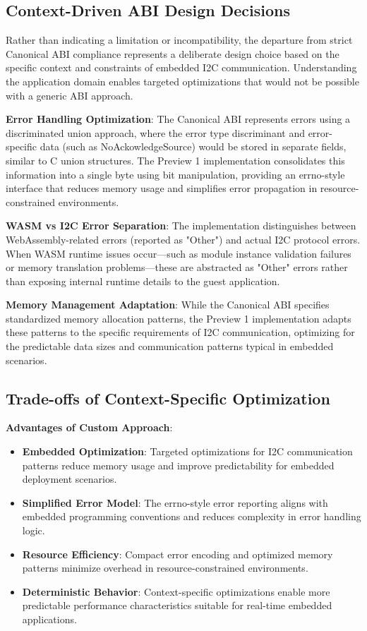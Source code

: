 \subsection{Context-Driven ABI Design Decisions}

Rather than indicating a limitation or incompatibility, the departure from strict Canonical ABI compliance represents a deliberate design choice based on the specific context and constraints of embedded I2C communication. Understanding the application domain enables targeted optimizations that would not be possible with a generic ABI approach.

\textbf{Error Handling Optimization}: The Canonical ABI represents errors using a discriminated union approach, where the error type discriminant and error-specific data (such as NoAckowledgeSource) would be stored in separate fields, similar to C union structures. The Preview 1 implementation consolidates this information into a single byte using bit manipulation, providing an errno-style interface that reduces memory usage and simplifies error propagation in resource-constrained environments.

\textbf{WASM vs I2C Error Separation}: The implementation distinguishes between WebAssembly-related errors (reported as "Other") and actual I2C protocol errors. When WASM runtime issues occur—such as module instance validation failures or memory translation problems—these are abstracted as "Other" errors rather than exposing internal runtime details to the guest application.

\textbf{Memory Management Adaptation}: While the Canonical ABI specifies standardized memory allocation patterns, the Preview 1 implementation adapts these patterns to the specific requirements of I2C communication, optimizing for the predictable data sizes and communication patterns typical in embedded scenarios.

\subsection{Trade-offs of Context-Specific Optimization}

\textbf{Advantages of Custom Approach}:
\begin{itemize}
    \item \textbf{Embedded Optimization}: Targeted optimizations for I2C communication patterns reduce memory usage and improve predictability for embedded deployment scenarios.
    \item \textbf{Simplified Error Model}: The errno-style error reporting aligns with embedded programming conventions and reduces complexity in error handling logic.
    \item \textbf{Resource Efficiency}: Compact error encoding and optimized memory patterns minimize overhead in resource-constrained environments.
    \item \textbf{Deterministic Behavior}: Context-specific optimizations enable more predictable performance characteristics suitable for real-time embedded applications.
\end{itemize}

